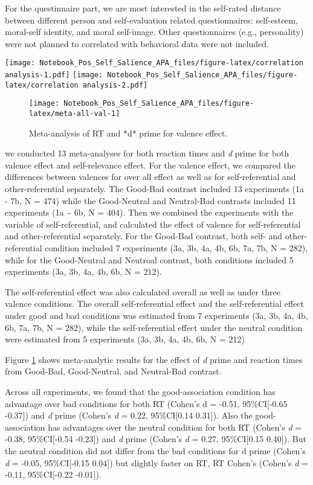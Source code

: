 \documentclass[
  man]{apa6}
\begin{document}
For the questinnaire part, we are most interested in the self-rated distance between different person and self-evaluation related questionnaires: self-esteem, moral-self identity, and moral self-image. Other questionnaires (e.g., personality) were not planned to correlated with behavioral data were not included.

\texttt{[image: Notebook\_Pos\_Self\_Salience\_APA\_files/figure-latex/correlation analysis-1.pdf]} \texttt{[image: Notebook\_Pos\_Self\_Salience\_APA\_files/figure-latex/correlation analysis-2.pdf]}

\begin{figure}

{\centering \texttt{[image: Notebook\_Pos\_Self\_Salience\_APA\_files/figure-latex/meta-all-val-1]} 

}

\caption{Meta-analysis of RT and *d* prime for valence effect.}\label{fig:meta-all-val}
\end{figure}

we conducted 13 meta-analyses for both reaction times and \emph{d} prime for both valence effect and self-relevance effect. For the valence effect, we compared the differences between valences for over all effect as well as for self-referential and other-referential separately. The Good-Bad contrast included 13 experiments (1a - 7b, N = 474) while the Good-Neutral and Neutral-Bad contrasts included 11 experiments (1a \textasciitilde{} 6b, N = 404). Then we combined the experiments with the variable of self-referential, and calculated the effect of valence for self-referential and other-referential separately. For the Good-Bad contrast, both self- and other-referential condition included 7 experiments (3a, 3b, 4a, 4b, 6b, 7a, 7b, N = 282), while for the Good-Neutral and Neutroal contrast, both conditions included 5 experiments (3a, 3b, 4a, 4b, 6b, N = 212).

The self-referential effect was also calculated overall as well as under three valence conditions. The overall self-referential effect and the self-referential effect under good and bad conditions was estimated from 7 experiments (3a, 3b, 4a, 4b, 6b, 7a, 7b, N = 282), while the self-referential effect under the neutral condition were estimated from 5 experiments (3a, 3b, 4a, 4b, 6b, N = 212)

Figure \ref{fig:meta-all-val} shows meta-analytic results for the effect of \emph{d} prime and reaction times from Good-Bad, Good-Neutral, and Neutral-Bad contrast.

Across all experiments, we found that the good-association condition has advantage over bad conditions for both RT (Cohen's d = -0.51, 95\%CI{[}-0.65 -0.37{]}) and \emph{d} prime (Cohen's \emph{d} = 0.22, 95\%CI{[}0.14 0.31{]}). Also the good-association has advantages over the neutral condition for both RT (Cohen's \emph{d} = -0.38, 95\%CI{[}-0.54 -0.23{]}) and \emph{d} prime (Cohen's \emph{d} = 0.27, 95\%CI{[}0.15 0.40{]}). But the neutral condition did not differ from the bad conditions for d prime (Cohen's \emph{d} = -0.05, 95\%CI{[}-0.15 0.04{]}) but slightly faster on RT, RT Cohen's (Cohen's \emph{d} = -0.11, 95\%CI{[}-0.22 -0.01{]}).
\end{document}
